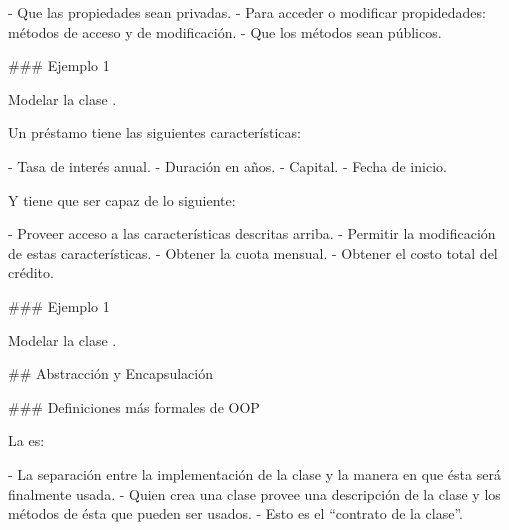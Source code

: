 - Que las propiedades sean privadas.
    - Para acceder o modificar propidedades: métodos de acceso y de modificación.
- Que los métodos sean públicos.

### Ejemplo 1

Modelar la clase .\newline

Un préstamo tiene las siguientes características:

- Tasa de interés anual.
- Duración en años.
- Capital.
- Fecha de inicio.

Y tiene que ser capaz de lo siguiente:

- Proveer acceso a las características descritas arriba.
- Permitir la modificación de estas características.
- Obtener la cuota mensual.
- Obtener el costo total del crédito.

### Ejemplo 1

Modelar la clase .\newline

\centering{}

## Abstracción y Encapsulación

### Definiciones más formales de OOP


La  es:

- La separación entre la implementación de la clase y la manera en que ésta será
finalmente usada.
- Quien crea una clase provee una descripción de la clase y los métodos de ésta que pueden ser usados.
    - Esto es el ``contrato de la clase''.



